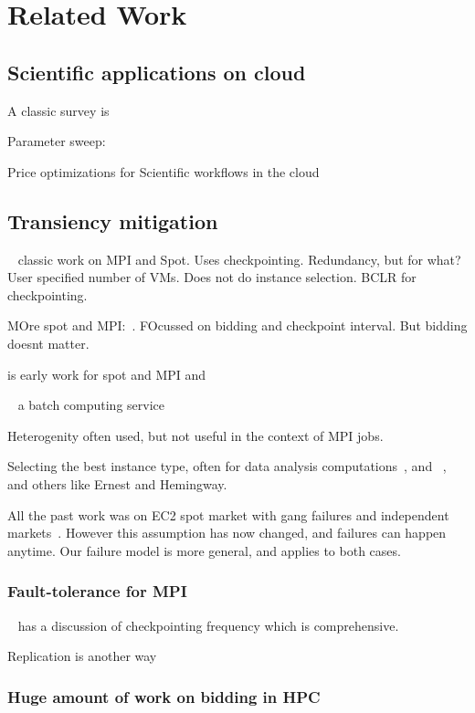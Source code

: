 \section{Related Work}

\subsection{Scientific applications on cloud}

A classic survey is ~\cite{iosup_performance_2011}
~\cite{zhai_cloud_2011}

Parameter sweep:~\cite{casanova_heuristics_2000}

Price optimizations for Scientific workflows in the cloud~\cite{gari_learning_2019}



\subsection{Transiency mitigation}

~\cite{marathe2014exploiting} classic work on MPI and Spot.
Uses checkpointing.
Redundancy, but for what?
User specified number of VMs. Does not do instance selection. 
BCLR for checkpointing.



MOre spot and MPI:~\cite{gong_monetary_2015}. FOcussed on bidding and checkpoint interval. But bidding doesnt matter. 


\cite{xiang_spotmpi:_2011} is early work for spot and MPI and 

~\cite{spoton} a batch computing service

Heterogenity often used, but not useful in the context of MPI jobs. 
~\cite{exosphere}

Selecting the best instance type, often for data analysis computations~\cite{alipourfard_cherrypick}, and ~\cite{yadwadkar_selecting_2017}, and others like Ernest and Hemingway.


All the past work was on EC2 spot market with gang failures and independent markets~\cite{marathe2014exploiting, gong_monetary_2015}.
However this assumption has now changed, and failures can happen anytime.
Our failure model is more general, and applies to both cases.




\subsubsection{Fault-tolerance for MPI}

~\cite{dongarra_fault_nodate} has a discussion of checkpointing frequency which is comprehensive.

Replication is another way~\cite{walters_replication-based_2009}


\subsubsection{Huge amount of work on bidding in HPC}

~\cite{wolski_probabilistic_2017}

~\cite{guo_bidding_2015}



